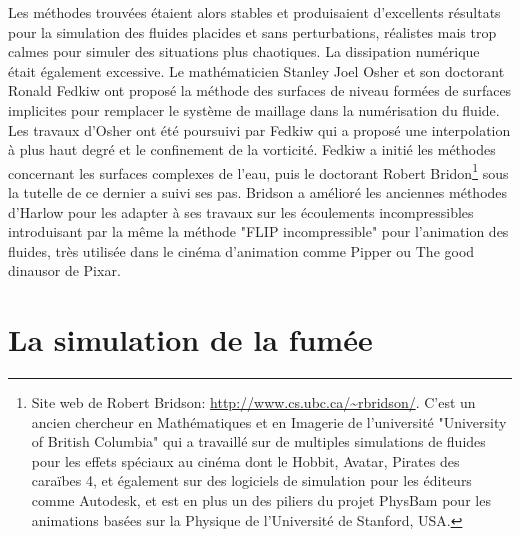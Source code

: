 \documentclass[11pt]{article}
\begin{document}
Les méthodes trouvées étaient alors stables et produisaient d'excellents résultats pour la simulation des fluides placides et sans perturbations, réalistes mais trop calmes pour simuler des situations plus chaotiques. La dissipation numérique était également excessive. Le mathématicien Stanley Joel Osher et son doctorant Ronald Fedkiw \cite{osher-fedkiw-2002} ont proposé la méthode des surfaces de niveau formées de surfaces implicites pour remplacer le système de maillage dans la numérisation du fluide. Les travaux d'Osher ont été poursuivi par Fedkiw qui a proposé une interpolation à plus haut degré et le confinement de la vorticité. Fedkiw a initié les méthodes concernant les surfaces complexes de l'eau, puis le doctorant Robert Bridon\footnote{Site web de Robert Bridson: \url{http://www.cs.ubc.ca/~rbridson/}. C'est un ancien chercheur en Mathématiques et en Imagerie de l'université "University of British Columbia" qui a travaillé sur de multiples simulations de fluides pour les effets spéciaux au cinéma dont le Hobbit, Avatar, Pirates des caraïbes 4, et également sur des logiciels de simulation pour les éditeurs comme Autodesk, et est en plus un des piliers du projet PhysBam pour les animations basées sur la Physique de l'Université de Stanford, USA.} sous la tutelle de ce dernier a suivi ses pas. Bridson a amélioré les anciennes méthodes d'Harlow pour les adapter à ses travaux sur les écoulements incompressibles introduisant par la même la méthode "FLIP incompressible" pour l'animation des fluides, très utilisée dans le cinéma d'animation comme Pipper \cite{serritella-2016} ou The good dinausor de Pixar\cite{reisch-2016}.

\section{La simulation de la fumée}
\end{document}
